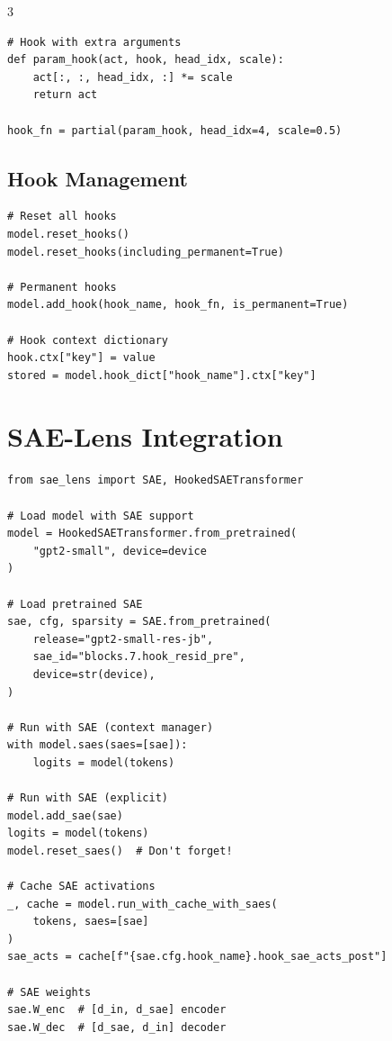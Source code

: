 \documentclass[10pt,a4paper,landscape]{article}
\begin{document}
\begin{multicols}{3}
\begin{lstlisting}
# Hook with extra arguments
def param_hook(act, hook, head_idx, scale):
    act[:, :, head_idx, :] *= scale
    return act

hook_fn = partial(param_hook, head_idx=4, scale=0.5)
\end{lstlisting}

\subsection{Hook Management}
\begin{lstlisting}
# Reset all hooks
model.reset_hooks()
model.reset_hooks(including_permanent=True)

# Permanent hooks
model.add_hook(hook_name, hook_fn, is_permanent=True)

# Hook context dictionary
hook.ctx["key"] = value
stored = model.hook_dict["hook_name"].ctx["key"]
\end{lstlisting}

\section{SAE-Lens Integration}

\begin{lstlisting}
from sae_lens import SAE, HookedSAETransformer

# Load model with SAE support
model = HookedSAETransformer.from_pretrained(
    "gpt2-small", device=device
)

# Load pretrained SAE
sae, cfg, sparsity = SAE.from_pretrained(
    release="gpt2-small-res-jb",
    sae_id="blocks.7.hook_resid_pre",
    device=str(device),
)

# Run with SAE (context manager)
with model.saes(saes=[sae]):
    logits = model(tokens)

# Run with SAE (explicit)
model.add_sae(sae)
logits = model(tokens)
model.reset_saes()  # Don't forget!

# Cache SAE activations
_, cache = model.run_with_cache_with_saes(
    tokens, saes=[sae]
)
sae_acts = cache[f"{sae.cfg.hook_name}.hook_sae_acts_post"]

# SAE weights
sae.W_enc  # [d_in, d_sae] encoder
sae.W_dec  # [d_sae, d_in] decoder
\end{lstlisting}


\end{multicols}
\end{document}
